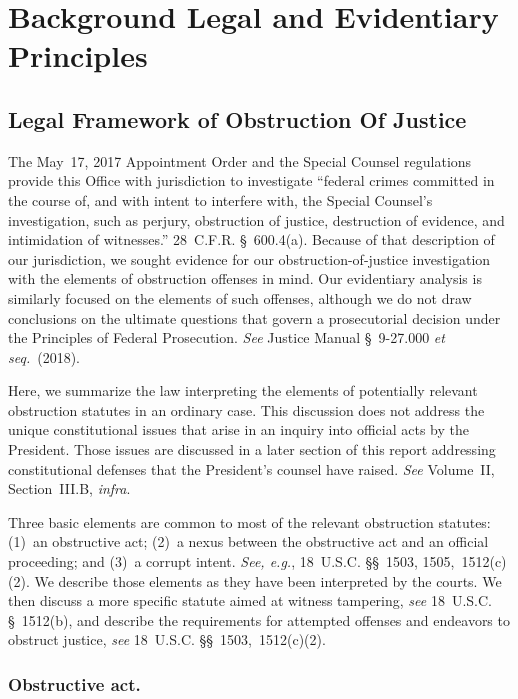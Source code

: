 \section{Background Legal and Evidentiary Principles}

\subsection{Legal Framework of Obstruction Of Justice}

The May~17, 2017 Appointment Order and the Special Counsel regulations provide this Office with jurisdiction to investigate ``federal crimes committed in the course of, and with intent to interfere with, the Special Counsel's investigation, such as perjury, obstruction of justice, destruction of evidence, and intimidation of witnesses.''
28~C.F.R. \S~600.4(a).
Because of that description of our jurisdiction, we sought evidence for our obstruction-of-justice investigation with the elements of obstruction offenses in mind.
Our evidentiary analysis is similarly focused on the elements of such offenses, although we do not draw conclusions on the ultimate questions that govern a prosecutorial decision under the Principles of Federal Prosecution.
\textit{See} Justice Manual \S~9-27.000 \textit{et seq.}~(2018).

Here, we summarize the law interpreting the elements of potentially relevant obstruction statutes in an ordinary case.
This discussion does not address the unique constitutional issues that arise in an inquiry into official acts by the President.
Those issues are discussed in a later section of this report addressing constitutional defenses that the President's counsel have raised. \textit{See} Volume~II, Section~III.B, \textit{infra}.

Three basic elements are common to most of the relevant obstruction statutes: (1)~an obstructive act; (2)~a nexus between the obstructive act and an official proceeding; and (3)~a corrupt intent.
\textit{See, e.g.}, 18~U.S.C. \S\S~1503, 1505,~1512(c)(2).
We describe those elements as they have been interpreted by the courts.
We then discuss a more specific statute aimed at witness tampering, \textit{see} 18~U.S.C. \S~1512(b), and describe the requirements for attempted offenses and endeavors to obstruct justice, \textit{see} 18~U.S.C. \S\S~1503,~1512(c)(2).

\subsubsection*{Obstructive act.}

